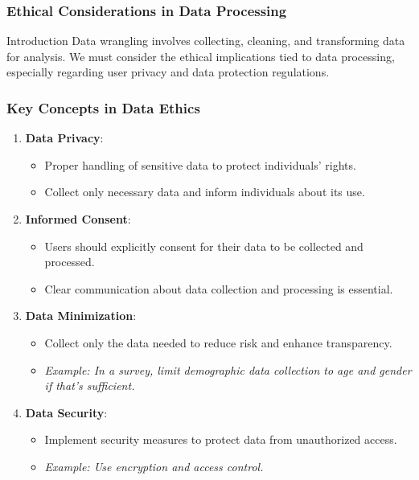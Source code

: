 \documentclass[aspectratio=169]{beamer}
\begin{document}
\begin{frame}[fragile]
    \frametitle{Ethical Considerations in Data Processing}
    \begin{block}{Introduction}
        Data wrangling involves collecting, cleaning, and transforming data for analysis. 
        We must consider the ethical implications tied to data processing, especially regarding user privacy and data protection regulations.
    \end{block}
\end{frame}

\begin{frame}[fragile]
    \frametitle{Key Concepts in Data Ethics}
    \begin{enumerate}
        \item \textbf{Data Privacy}:
            \begin{itemize}
                \item Proper handling of sensitive data to protect individuals' rights.
                \item Collect only necessary data and inform individuals about its use.
            \end{itemize}
        \item \textbf{Informed Consent}:
            \begin{itemize}
                \item Users should explicitly consent for their data to be collected and processed.
                \item Clear communication about data collection and processing is essential.
            \end{itemize}
        \item \textbf{Data Minimization}:
            \begin{itemize}
                \item Collect only the data needed to reduce risk and enhance transparency.
                \item \textit{Example: In a survey, limit demographic data collection to age and gender if that's sufficient.}
            \end{itemize}
        \item \textbf{Data Security}:
            \begin{itemize}
                \item Implement security measures to protect data from unauthorized access.
                \item \textit{Example: Use encryption and access control.}
            \end{itemize}
    \end{enumerate}
\end{frame}
\end{document}
